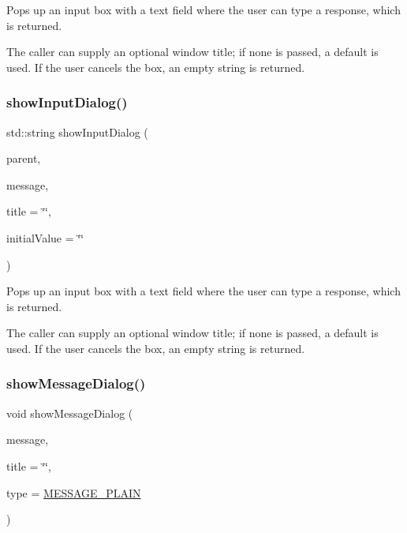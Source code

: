 Pops up an input box with a text field where the user can type a response, which is returned. 

The caller can supply an optional window title; if none is passed, a default is used. If the user cancels the box, an empty string is returned. \mbox{\label{classGOptionPane_aabd3a04a3cdc998ee0e7e7e31676df17}} 
\subsubsection{\texorpdfstring{show\+Input\+Dialog()}{showInputDialog()}\hspace{0.1cm}{\footnotesize\ttfamily [3/3]}}
{\footnotesize\ttfamily std\+::string show\+Input\+Dialog (\begin{DoxyParamCaption}\item[{Q\+Widget $\ast$}]{parent,  }\item[{const std\+::string \&}]{message,  }\item[{const std\+::string \&}]{title = {\ttfamily \char`\"{}\char`\"{}},  }\item[{const std\+::string \&}]{initial\+Value = {\ttfamily \char`\"{}\char`\"{}} }\end{DoxyParamCaption})\hspace{0.3cm}{\ttfamily [static]}}



Pops up an input box with a text field where the user can type a response, which is returned. 

The caller can supply an optional window title; if none is passed, a default is used. If the user cancels the box, an empty string is returned. \mbox{\label{classGOptionPane_af4df9c721d9e832e17953c9465bfd9ea}} 
\subsubsection{\texorpdfstring{show\+Message\+Dialog()}{showMessageDialog()}\hspace{0.1cm}{\footnotesize\ttfamily [1/3]}}
{\footnotesize\ttfamily void show\+Message\+Dialog (\begin{DoxyParamCaption}\item[{const std\+::string \&}]{message,  }\item[{const std\+::string \&}]{title = {\ttfamily \char`\"{}\char`\"{}},  }\item[{\mbox{\hyperlink{classGOptionPane_ac6606ebe91c8ac66a2c314c79f5ab013}{Message\+Type}}}]{type = {\ttfamily \mbox{\hyperlink{classGOptionPane_ac6606ebe91c8ac66a2c314c79f5ab013ac03a17c74c589b004d166532958a6196}{M\+E\+S\+S\+A\+G\+E\+\_\+\+P\+L\+A\+IN}}} }\end{DoxyParamCaption})\hspace{0.3cm}{\ttfamily [static]}}




